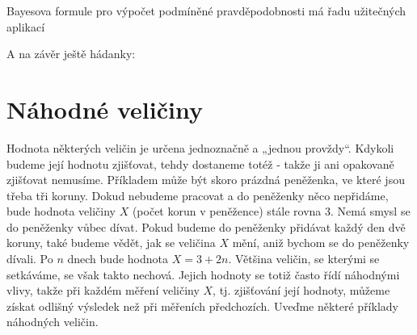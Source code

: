       Bayesova formule pro výpočet podmíněné pravděpodobnosti má řadu užitečných aplikací
      
      
      
      A na závěr ještě hádanky:

      
      
      
      
  \section{Náhodné veličiny}\label{mai:IchapIIIsecII}
    Hodnota některých veličin je určena jednoznačně a „jednou provždy“. Kdykoli budeme její hodnotu 
    zjišťovat, tehdy dostaneme totéž - takže ji ani opakovaně zjišťovat nemusíme. Příkladem může 
    být skoro prázdná peněženka, ve které jsou třeba tři koruny. Dokud nebudeme pracovat a do 
    peněženky něco nepřidáme, bude hodnota veličiny \(X\) (počet korun v peněžence) stále rovna 
    \num{3}. Nemá smysl se do peněženky vůbec dívat. Pokud budeme do peněženky přidávat každý den 
    dvě koruny, také budeme vědět, jak se veličina \(X\) mění, aniž bychom se do peněženky dívali. 
    Po \(n\) dnech bude hodnota \(X = 3 + 2n\). Většina veličin, se kterými se setkáváme, se však 
    takto nechová. Jejich hodnoty se totiž často řídí náhodnými vlivy, takže při každém
    měření veličiny \(X\), tj. zjišťování její hodnoty, můžeme získat odlišný výsledek než při 
    měřeních předchozích. Uveďme některé příklady náhodných veličin.
    
